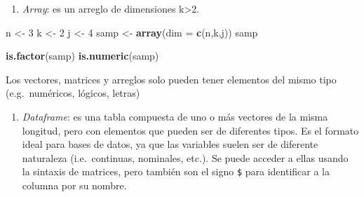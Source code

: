 \documentclass[
]{article}
\newenvironment{Shaded}{\begin{snugshade}}{\end{snugshade}}
\newcommand{\CommentTok}[1]{\textcolor[rgb]{0.56,0.35,0.01}{\textit{#1}}}
\newcommand{\DataTypeTok}[1]{\textcolor[rgb]{0.13,0.29,0.53}{#1}}
\newcommand{\DecValTok}[1]{\textcolor[rgb]{0.00,0.00,0.81}{#1}}
\newcommand{\KeywordTok}[1]{\textcolor[rgb]{0.13,0.29,0.53}{\textbf{#1}}}
\newcommand{\NormalTok}[1]{#1}
\newcommand{\OperatorTok}[1]{\textcolor[rgb]{0.81,0.36,0.00}{\textbf{#1}}}
\newcommand{\StringTok}[1]{\textcolor[rgb]{0.31,0.60,0.02}{#1}}
\providecommand{\tightlist}{%
  \setlength{\itemsep}{0pt}\setlength{\parskip}{0pt}}
\begin{document}
\begin{enumerate}
\def\labelenumi{\Alph{enumi})}
\setcounter{enumi}{2}
\tightlist
\item
  \emph{Array}: es un arreglo de dimensiones k\textgreater2.
\end{enumerate}

\begin{Shaded}
\begin{Highlighting}[]
\NormalTok{n <-}\StringTok{ }\DecValTok{3}
\NormalTok{k <-}\StringTok{ }\DecValTok{2}
\NormalTok{j <-}\StringTok{ }\DecValTok{4}
\NormalTok{samp <-}\StringTok{ }\KeywordTok{array}\NormalTok{(}\DataTypeTok{dim =} \KeywordTok{c}\NormalTok{(n,k,j))}
\NormalTok{samp}

\KeywordTok{is.factor}\NormalTok{(samp)}
\KeywordTok{is.numeric}\NormalTok{(samp)}
\end{Highlighting}
\end{Shaded}

Los vectores, matrices y arreglos solo pueden tener elementos del mismo
tipo (e.g.~numéricos, lógicos, letras)

\begin{enumerate}
\def\labelenumi{\Alph{enumi})}
\setcounter{enumi}{3}
\tightlist
\item
  \emph{Dataframe}: es una tabla compuesta de uno o más vectores de la
  misma longitud, pero con elementos que pueden ser de diferentes tipos.
  Es el formato ideal para bases de datos, ya que las variables suelen
  ser de diferente naturaleza (i.e.~continuas, nominales, etc.). Se
  puede acceder a ellas usando la sintaxis de matrices, pero también son
  el signo \texttt{\$} para identificar a la columna por su nombre.
\end{enumerate}

\begin{Shaded}
\end{Shaded}
\end{document}
